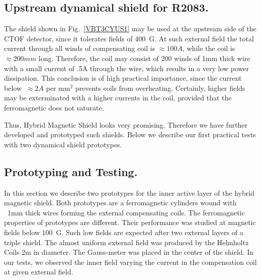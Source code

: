 \documentclass[12pt]{article}
\begin{document}
\subsection{Upstream dynamical shield for R2083.}
The  shield shown in Fig.~\ref{VBT3CYUS1}  may be used at the 
upstream side of the CTOF detector, since it tolerates fields of 400~G. 
 At such external field the total current  through all winds of  compensating  coil 
is $\approx100A$, while  the coil is  $\approx200mm$ long.
Therefore,  the coil  may consist of  200 winds  of 1mm thick wire  with a small current of .5A through the wire, which results in a very low power dissipation.
This conclusion is of high practical importance, since 
the  current   below  $~\approx 2A$ per mm$^2$ prevents coils from  overheating.
Certainly,  higher fields may be  exterminated with a higher currents in the  coil, 
provided that the ferromagnetic does not saturate.

Thus, Hybrid Magnetic Shield looks very promising. Therefore
we have further developed and  prototyped  such shields.
Below we describe our first practical tests with two dynamical shield prototypes.

\subsection{Prototyping and Testing.}
In this section we describe two prototypes for the inner active layer of the hybrid
magnetic shield.  Both  prototypes are a ferromagnetic cylinders wound  
with ~1mm thick wires forming the external compensating coils.
The ferromagnetic properties of  prototypes are  different. Their performance was studied  
at  magnetic fields below 100~G.  Such low fields  are  
expected  after two  external layers of a triple shield.
The almost uniform external field was produced by the Helmholtz Coils 2m in diameter. 
The Gauss-meter was placed in the center of the shield.  In our tests, we observed the 
inner field  varying the current in the compensation coil at given  external field.
\end{document}
